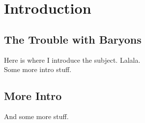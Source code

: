
\chapter{Introduction}
\label{c.Intro}
\section{The Trouble with Baryons}
\label{s.Trouble}
Here is where I introduce the subject. Lalala.\\

Some more intro stuff.\\

\section{More Intro}
\label{s.More}
And some more stuff.\\
